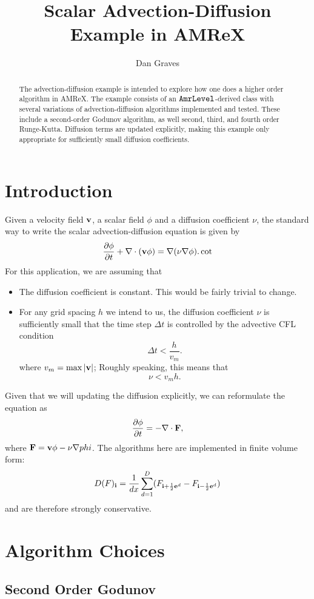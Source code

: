 \documentclass{article}
\title{Scalar Advection-Diffusion Example in AMReX}
\author{Dan Graves}
\newcommand{\ibold}{{\bf i}}
\newcommand{\ebold}{{\bf e}}
\newcommand{\vbold}{{\bf v}}
\newcommand{\Fbold}{{\bf F}}
\newcommand{\dt}{{\Delta t}}
\newcommand{\dx}{{h}}
\newcommand{\half}{\frac{1}{2}}
\newcommand{\iph}{{\ibold + \half \ebold^d}}
\newcommand{\imh}{{\ibold - \half \ebold^d}}
\begin{document}
\begin{abstract}
  The advection-diffusion example is intended to explore how one does
  a higher order algorithm in AMReX.    The example consists of an
  $\tt{AmrLevel}$-derived class with several variations of
  advection-diffusion algorithms implemented and tested.  These
  include a second-order Godunov algorithm, as well second, third, and
  fourth order Runge-Kutta.   Diffusion terms are updated explicitly,
  making this example only appropriate for sufficiently small
  diffusion coefficients.
\end{abstract}

\section{Introduction}

Given a velocity field $\vbold$, a scalar field  $\phi$ and a
diffusion coefficient $\nu$, the standard way to write the 
scalar advection-diffusion equation  is given by 
$$
\frac{\partial \phi}{\partial t} + \nabla \cdot (\vbold \phi) = \nabla
(\nu \nabla \phi).
\cot 
$$
For this application, we are assuming that 
\begin{itemize}
\item The diffusion coefficient is constant.  This would be fairly
  trivial to change.
\item For any grid spacing $\dx$ we intend to us, the diffusion
  coefficient $\nu$ is sufficiently small that the time
  step $\dt$ is controlled by the advective CFL condition
$$
\dt < \frac{\dx}{v_m}.
$$
where $v_m= \max|\vbold|$;
Roughly speaking, this means that 
$$
\nu < v_m \dx.
$$
\end{itemize}
Given that we will updating the diffusion explicitly, we can
reformulate the equation as 
$$
\frac{\partial \phi}{\partial t} =  -\nabla \cdot \Fbold, 
$$
where $\Fbold = \vbold \phi - \nu \nabla phi$.
The algorithms here are implemented in finite volume form:
$$
D(F)_\ibold = \frac{1}{dx} \sum^D_{d = 1} (F_{\iph} - F_\imh)
$$
and are
therefore strongly conservative.

\section{Algorithm Choices}

\subsection{Second Order Godunov} 
\end{document}
